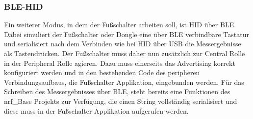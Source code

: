 \subsubsection{BLE-HID}
Ein weiterer Modus, in dem der Fußschalter arbeiten soll, ist \ac{HID} über \ac{BLE}. Dabei simuliert der Fußschalter oder Dongle eine über \ac{BLE} verbindbare Tastatur und serialisiert nach dem Verbinden wie bei \ac{HID} über \ac{USB} die Messergebnisse als Tastendrücken. Der Fußschalter muss daher nun zusätzlich zur Central Rolle in der Peripheral Rolle agieren. Dazu muss einerseits das Advertising korrekt konfiguriert werden und in den bestehenden Code des peripheren Verbindungsaufbaus, die Fußschalter Applikation, eingebunden werden. Für das Schreiben des Messergebnisses über \ac{BLE}, steht bereits eine Funktionen des nrf\_Base Projekts zur Verfügung, die einen String vollständig serialisiert und diese muss in der Fußschalter Applikation aufgerufen werden.\\
